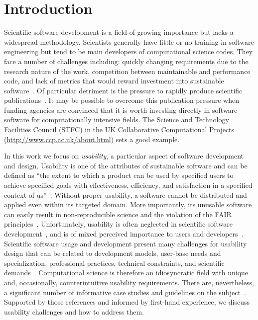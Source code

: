 \documentclass[conference]{IEEEtran}
\begin{document}
\section{Introduction}
Scientific software development is a field of growing importance
but lacks a widespread methodology.
Scientists generally have little or no training
in software engineering but tend to be main developers of
computational science codes. They face a number of challenges including:
quickly changing requirements due to the research nature of the work,
competition between maintainable and performance code, and lack of metrics
that would reward investment into sustainable software~\cite{Segal:2007, Kelly:2007}. 
Of particular detriment is the pressure to rapidly produce scientific
publications~\cite{Wilson:2006, Killcoyne:2009}. 
It may be possible to overcome this publication pressure 
when funding agencies are convinced that it is 
worth investing directly in software software for computationally intensive fields. 
The Science and Technology Facilities Council (STFC) in the UK Collaborative 
Computational Projects (\url{http://www.ccp.ac.uk/about.html}) 
sets a good example.


In this work we focus on \emph{usability}, a particular aspect of
software development and design. Usability  is one of the attributes of
sustainable software and can be defined as
``the extent to which a product can be used by specified users to achieve
specified goals with effectiveness, efficiency, and satisfaction in a specified
context of us''~\cite[p.3]{Venters_WSSSPE}. Without proper usability, a software 
cannot be distributed and applied even within its targeted domain.
More importantly, its unusable software can easily result in non-reproducible 
science and the violation of the FAIR principles~\cite{Wilkinson:2016}. 
Unfortunately, usability is often neglected in scientific software development~\cite{Ahmed:2014},
and is of mixed perceived importance to users and developers~\cite{Nguyen-Hoan:2010, Hucka:2016}.
Scientific software usage and development present many challenges for usability 
design that can be related to development models, user-base needs and 
specialization, professional practices, technical constraints, and scientific 
demands~\cite{Queiroz:2016}. Computational science is therefore 
an idiosyncratic field with unique and, occasionally, counterintuitive usability 
requirements. There are, nevertheless, a significant number of informative 
case studies and guidelines on the subject~\cite{MacLeod:1992, Springmeyer:1993, 
Pancake:1996, Javahery:2004, Schraefel:2004,Letondal:2004,Talbott:2005, 
Macaulay:2009, DeRoure:2009, Keefe:2010, DeMatos:2013,Ahmed:2014, Fangohr:2016, 
Beg:2016,List:2017}. Supported by those references and informed by first-hand
experience, we discuss usability challenges and how to address them. 
\end{document}
